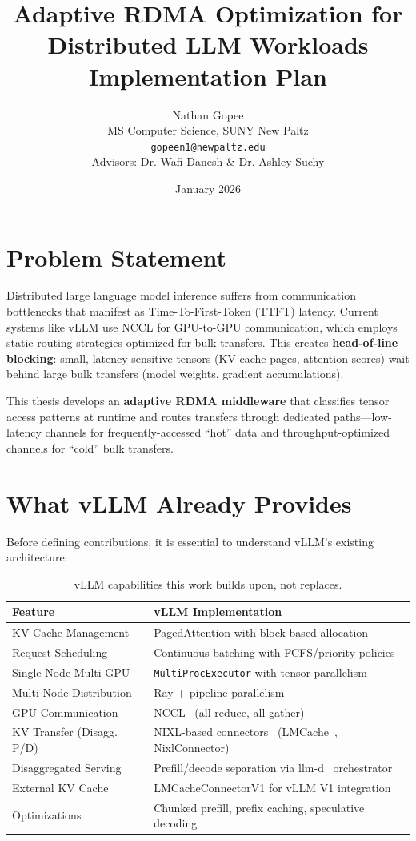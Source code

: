 \documentclass[10pt,letterpaper]{article}
\title{\textbf{Adaptive RDMA Optimization for Distributed LLM Workloads}\\[0.5em]
\large Implementation Plan}
\author{Nathan Gopee\\
MS Computer Science, SUNY New Paltz\\
\texttt{gopeen1@newpaltz.edu}\\[1em]
\small Advisors: Dr. Wafi Danesh \& Dr. Ashley Suchy}
\date{January 2026}
\begin{document}
\maketitle

\section{Problem Statement}

Distributed large language model inference suffers from communication bottlenecks that manifest as Time-To-First-Token (TTFT) latency. Current systems like vLLM use NCCL for GPU-to-GPU communication, which employs static routing strategies optimized for bulk transfers. This creates \textbf{head-of-line blocking}: small, latency-sensitive tensors (KV cache pages, attention scores) wait behind large bulk transfers (model weights, gradient accumulations).

This thesis develops an \textbf{adaptive RDMA middleware} that classifies tensor access patterns at runtime and routes transfers through dedicated paths---low-latency channels for frequently-accessed ``hot'' data and throughput-optimized channels for ``cold'' bulk transfers.

\section{What vLLM Already Provides}

Before defining contributions, it is essential to understand vLLM's existing architecture:

\begin{table}[h]
\centering
\small
\begin{tabular}{@{}ll@{}}
\toprule
\textbf{Feature} & \textbf{vLLM Implementation} \\
\midrule
KV Cache Management & PagedAttention with block-based allocation \\
Request Scheduling & Continuous batching with FCFS/priority policies \\
Single-Node Multi-GPU & \texttt{MultiProcExecutor} with tensor parallelism \\
Multi-Node Distribution & Ray + pipeline parallelism \\
GPU Communication & NCCL~\cite{nccl} (all-reduce, all-gather) \\
KV Transfer (Disagg. P/D) & NIXL-based connectors~\cite{nixl} (LMCache~\cite{lmcache}, NixlConnector) \\
Disaggregated Serving & Prefill/decode separation via llm-d~\cite{llm-d} orchestrator \\
External KV Cache & LMCacheConnectorV1 for vLLM V1 integration \\
Optimizations & Chunked prefill, prefix caching, speculative decoding \\
\bottomrule
\end{tabular}
\caption{vLLM capabilities this work builds upon, not replaces.}
\end{table}
\end{document}
